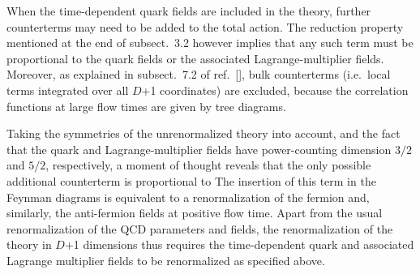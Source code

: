 When the time-dependent quark fields are included in the theory,
further counter\-terms may need to be added to the total action.
The reduction property mentioned at the end of subsect.~3.2
however implies that any such term
must be proportional to the quark fields or
the associated Lagrange-multiplier fields.
Moreover,
as explained in subsect.~7.2 of ref.~[\cite{RenFlow}], 
bulk counterterms (i.e.~local terms integrated over all
$D$+1 coordinates)
are excluded, because
the correlation functions at large flow times
are given by tree diagrams. 

Taking the symmetries of the unrenormalized theory 
into account, and the fact
that the quark and Lagrange-multiplier fields have
power-counting dimension $3/2$ and $5/2$, respectively,
a moment of thought reveals that the only possible additional
counterterm is proportional to
The insertion of this term in the Feynman diagrams
is equivalent to a renormalization 
of the fermion and, similarly, the anti-fermion fields
at positive flow time.
Apart from the usual renormalization of the 
QCD parameters and fields,
the renormalization of the theory in $D$+1
dimensions thus requires the time-dependent quark
and associated Lagrange multiplier fields 
to be renormalized as specified above.
